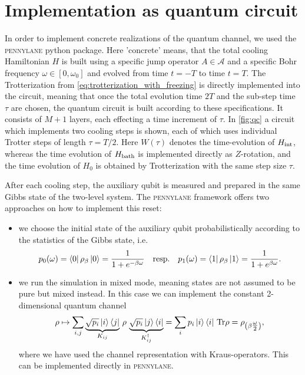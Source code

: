 \documentclass[12pt,a4paper]{article}
\begin{document}
\section{Implementation as quantum circuit}
In order to implement concrete realizations of the quantum channel, we used the \textsc{pennylane} python package. Here 'concrete' means, that the total cooling Hamiltonian $H$ is built using a specific jump operator $A\in \mathcal{A}$ and a specific Bohr frequency $\omega\in [0, \omega_0]$ and evolved from time $t=-T$ to time $t=T$. The Trotterization from \cref{eq:trotterization_with_freezing} is directly implemented into the circuit, meaning that once the total evolution time $2T$ and the sub-step time $\tau$ are chosen, the quantum circuit is built according to these specifications. It consists of $M+1$ layers, each effecting a time increment of $\tau$. In \cref{fig:qc} a circuit which implements two cooling steps is shown, each of which uses individual Trotter steps of length $\tau = T/2$. Here $W(\tau)$ denotes the time-evolution of $H_{\rm int}$, whereas the time evolution of $H_{\rm bath}$ is implemented directly as $Z$-rotation, and the time evolution of $H_0$ is obtained by Trotterization with the same step size $\tau$.

After each cooling step, the auxiliary qubit is measured and prepared in the same Gibbs state of the two-level system. The \textsc{pennylane} framework offers two approaches on how to implement this reset:

\begin{itemize}
    \item we choose the initial state of the auxiliary qubit probabilistically according to the statistics of the Gibbs state, i.e. 
    \begin{align}
        p_0(\omega)=\bra{0}\rho_{\rm \beta}\ket{0} = \frac{1}{1+e^{-\beta \omega}} \quad\mbox{resp.}\quad p_1(\omega)=\bra{1}\rho_{\rm \beta}\ket{1} = \frac{1}{1+e^{\beta \omega}} .
    \end{align}
    \item we run the simulation in mixed mode, meaning states are not assumed to be pure but mixed instead. In this case we can implement the constant 2-dimensional quantum channel 
    \begin{align}\label{eq:constant_channel}
        \rho \mapsto \sum_{i,j}  \underbrace{\sqrt{p_i}\ket{i}\bra{j}}_{K_{ij}}\,\rho\, \underbrace{\sqrt{p_i}\ket{j}\bra{i}}_{K_{ij}^{\dagger}} = \sum_{i} p_i \ket{i}\bra{i}\, \rm{Tr}\rho = \rho_{\left(\beta \tfrac{\omega}{2}\right)},
    \end{align} where we have used the channel representation with Kraus-operators. This can be implemented directly in \textsc{pennylane}.
\end{itemize}
\end{document}

